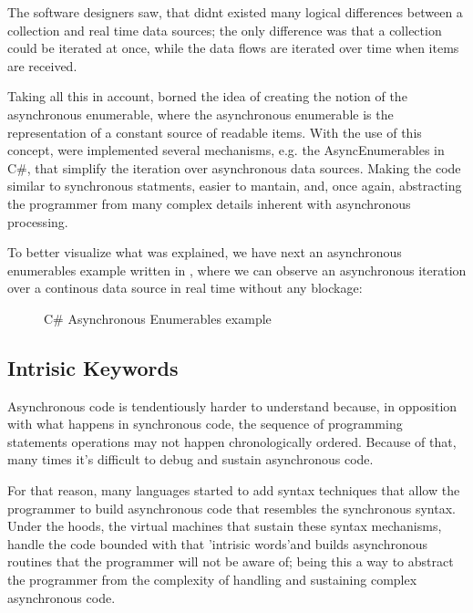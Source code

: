 	The software designers saw, that didnt existed many logical differences between a collection and real time data sources; 
	the only difference was that a collection could be iterated at once, while the data flows are iterated over time when items are received.

	Taking all this in account, borned the idea of creating the notion of the asynchronous enumerable, where the asynchronous enumerable is the representation of a constant source of readable items.
	With the use of this concept, were implemented several mechanisms, e.g. the AsyncEnumerables in C\#, that simplify the iteration over asynchronous data sources. 
	Making the code similar to synchronous statments, easier to mantain, and, once again, abstracting the programmer from many complex details inherent with asynchronous processing.

	To better visualize what was explained, we have next an asynchronous enumerables example written in , where we can observe an asynchronous iteration over a continous data source in real time without any blockage:
	\clearpage

	\begin{figure}[H]
		\centering
		\caption{C\# Asynchronous Enumerables example}
		\label{fig:enumex}
	\end{figure}
	
	\clearpage
    

	\subsection{Intrisic Keywords} 
	
	Asynchronous code is tendentiously harder to understand because, in opposition with what happens in synchronous code, the sequence of programming statements operations may not happen chronologically ordered. 
	Because of that, many times it's difficult to debug and sustain asynchronous code. 

	For that reason, many languages started to add syntax techniques that allow the programmer to build asynchronous code that resembles the synchronous syntax.
	Under the hoods, the virtual machines that sustain these syntax mechanisms, handle the code bounded with that 'intrisic words'and builds asynchronous routines that the programmer will not be aware of;
	being this a way to abstract the programmer from the complexity of handling and sustaining complex asynchronous code. 

